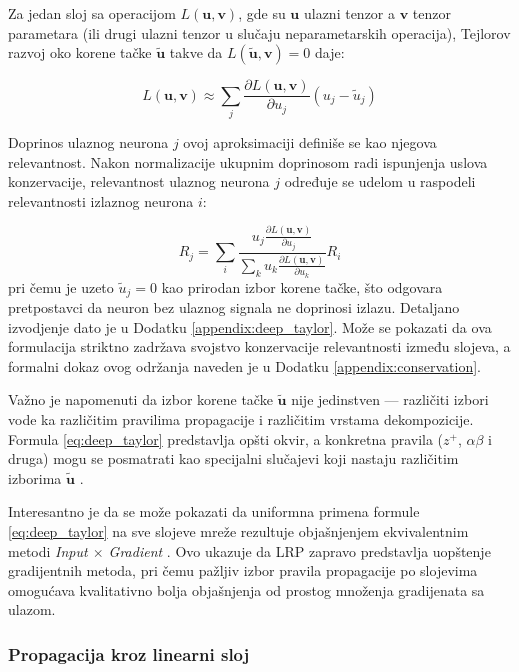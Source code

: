 Za jedan sloj sa operacijom $L(\mathbf{u}, \mathbf{v})$, gde su $\mathbf{u}$ 
ulazni tenzor a $\mathbf{v}$ tenzor parametara (ili drugi ulazni tenzor u 
slučaju neparametarskih operacija), Tejlorov razvoj oko korene tačke 
$\tilde{\mathbf{u}}$ takve da $L(\tilde{\mathbf{u}}, \mathbf{v}) = 0$ daje:

\begin{equation}
    L(\mathbf{u}, \mathbf{v}) \approx \sum_j 
    \frac{\partial L(\mathbf{u}, \mathbf{v})}{\partial u_j} 
    (u_j - \tilde{u}_j)
\end{equation}

Doprinos ulaznog neurona $j$ ovoj aproksimaciji definiše se kao njegova relevantnost. Nakon normalizacije ukupnim doprinosom radi ispunjenja uslova konzervacije, relevantnost ulaznog neurona $j$ određuje se udelom u raspodeli relevantnosti izlaznog neurona $i$:

\begin{equation}
    R_j = \sum_i \frac{u_j \frac{\partial L(\mathbf{u}, \mathbf{v})}{\partial u_j}}
    {\sum_k u_k \frac{\partial L(\mathbf{u}, \mathbf{v})}{\partial u_k}} R_i
    \label{eq:deep_taylor}
\end{equation}
pri čemu je uzeto $\tilde{u}_j = 0$ kao prirodan izbor korene tačke, što 
odgovara pretpostavci da neuron bez ulaznog signala ne doprinosi izlazu. 
Detaljano izvodjenje dato je u Dodatku \ref{appendix:deep_taylor}.
Može se pokazati da ova formulacija striktno zadržava svojstvo konzervacije relevantnosti između slojeva, a formalni dokaz ovog održanja naveden je u Dodatku \ref{appendix:conservation}.

Važno je napomenuti da izbor korene tačke $\tilde{\mathbf{u}}$ nije jedinstven 
— različiti izbori vode ka različitim pravilima propagacije i različitim 
vrstama dekompozicije. Formula \eqref{eq:deep_taylor} predstavlja opšti okvir, 
a konkretna pravila ($z^+$, $\alpha\beta$ i druga) mogu se posmatrati kao 
specijalni slučajevi koji nastaju različitim izborima $\tilde{\mathbf{u}}$ 
\cite{montavon2017explaining}.

Interesantno je da se može pokazati da uniformna primena formule 
\eqref{eq:deep_taylor} na sve slojeve mreže rezultuje objašnjenjem ekvivalentnim 
metodi \textit{Input $\times$ Gradient} \cite{montavon2019lrp}. Ovo ukazuje da 
LRP zapravo predstavlja uopštenje gradijentnih metoda, pri čemu pažljiv izbor 
pravila propagacije po slojevima omogućava kvalitativno bolja objašnjenja od 
prostog množenja gradijenata sa ulazom.

\subsubsection{Propagacija kroz linearni sloj}

